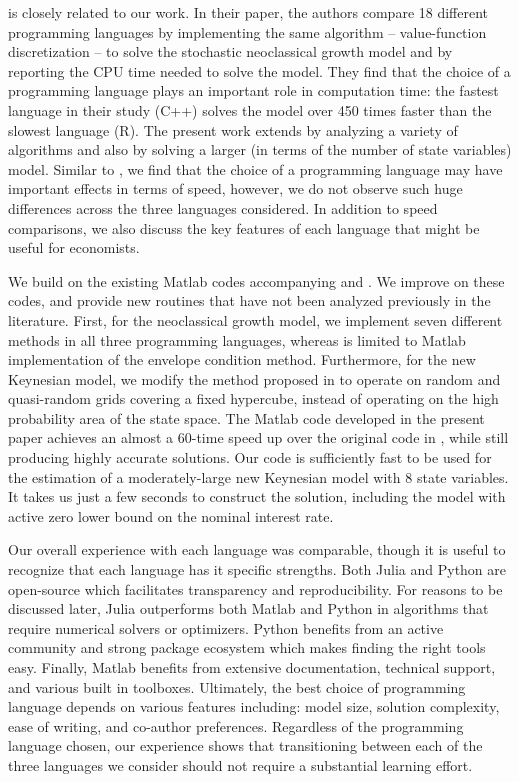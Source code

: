 \cite{AF2014} is closely related to our work. In their paper, the authors
compare 18 different programming languages by implementing the same algorithm --
value-function discretization -- to solve the stochastic neoclassical growth
model and by reporting the CPU time needed to solve the model. They find that
the choice of a programming language plays an important role in computation
time: the fastest language in their study (C++) solves the model over 450 times
faster than the slowest language (R). The present work extends \cite{AF2014} by
analyzing a variety of algorithms and also by solving a larger (in terms of the
number of state variables) model. Similar to \cite{AF2014}, we find that the
choice of a programming language may have important effects in terms of speed,
however, we do not observe such huge differences across the three languages
considered. In addition to speed comparisons, we also discuss the key features
of each language that might be useful for economists.

We build on the existing Matlab codes accompanying \cite{AMMT2016} and
\cite{MM2015}. We improve on these codes, and provide new routines that have
not been analyzed previously in the literature. First, for the neoclassical
growth model, we implement seven different methods in all three programming languages, whereas \cite{AMMT2016} is limited to Matlab implementation of the envelope condition method.
Furthermore, for the new Keynesian model, we modify the method proposed in \cite{MM2015} to operate on random and quasi-random
grids covering a fixed hypercube, instead of operating on the high probability area of the state space. The Matlab code developed in the present paper achieves an almost a 60-time speed up over the original code in \cite{MM2015},
while still producing highly accurate solutions. Our code is sufficiently fast
to be used for the estimation of a moderately-large new Keynesian model with 8
state variables. It takes us just a few seconds to construct the solution, including the model with active zero lower bound on the nominal interest rate.

Our overall experience with each language was comparable, though it is useful
to recognize that each language has it specific strengths. Both Julia and
Python are open-source which facilitates transparency and reproducibility. For
reasons to be discussed later, Julia outperforms both Matlab and Python in
algorithms that require numerical solvers or optimizers. Python benefits from
an active community and strong package ecosystem which makes finding the right
tools easy. Finally, Matlab benefits from extensive documentation, technical
support, and various built in toolboxes. Ultimately, the best choice of
programming language depends on various features including: model size,
solution complexity, ease of writing, and co-author preferences. Regardless of
the programming language chosen, our experience shows that transitioning
between each of the three languages we consider should not require a
substantial learning effort.

